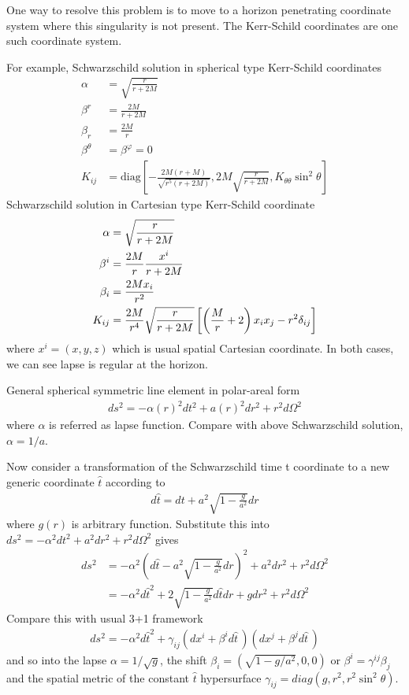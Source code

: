 \documentclass[a4paper,oneside,openany,11pt]{memoir}
\numberwithin{equation}{section} %
\begin{document}
One way to resolve this problem is to move to a horizon penetrating coordinate system where this singularity is not present. The Kerr-Schild coordinates are one such coordinate system. 

For example, Schwarzschild solution in spherical type Kerr-Schild coordinates
\begin{align}
\alpha &= \sqrt{\frac{r}{r+2M}} \\
\beta^r &= \frac{2M}{r+2M} \\
\beta_r &=\frac{2M}{r} \\
\beta^\theta &= \beta^\varphi = 0 \\
K_{ij} &= \textrm{diag} \left[ -\frac{2M(r+M)}{\sqrt{r^5 (r+2M)}} , 2M \sqrt{\frac{r}{r+2M}}, K_{\theta \theta} \sin^2 \theta \right]
\end{align}
Schwarzschild solution in Cartesian type Kerr-Schild coordinate
\begin{align}
\alpha &= \sqrt{\frac{r}{r+2M}} \\
\beta^i &= \frac{2M}{r} \frac{x^i}{r+2M} \\
\beta_i &=\frac{2M x_i}{r^2} \\
K_{ij} &= \-\frac{2M}{r^4} \sqrt{\frac{r}{r+2M}} \left[ \left( \frac{M}{r}+2 \right) x_i x_j - r^2 \delta_{ij} \right]
\end{align}
where $x^i = (x,y,z)$ which is usual spatial Cartesian coordinate. In both cases, we can see lapse is regular at the horizon.

General spherical symmetric line element in polar-areal form
\begin{align}
\label{eqn:ss-met-pa}
ds^2 = - \alpha(r)^2 dt^2 + a(r)^2 dr^2 + r^2 d \Omega^2
\end{align}
where $\alpha$ is referred as lapse function. Compare with above Schwarzschild solution, $\alpha = 1/a$. 

Now consider a transformation of the Schwarzschild time t coordinate to a new generic coordinate $\hat{t}$ according to
\begin{align}
d\hat{t} = dt + a^2 \sqrt{1-\frac{g}{a^2}} dr
\end{align}
where $g(r)$ is arbitrary function. Substitute this into $ds^2 = -\alpha^2 dt^2 + a^2 dr^2 + r^2 d\Omega^2$ gives
\begin{align}
ds^2 &= - \alpha^2 \left (d\hat{t} - a^2 \sqrt{1-\frac{g}{a^2}} dr\right)^2 + a^2 dr^2 + r^2 d\Omega^2 \nonumber \\
&= - \alpha^2 d \hat{t}^2 + 2 \sqrt{1-\frac{g}{a^2}} d\hat{t} dr + g dr^2 + r^2 d \Omega^2
\end{align}
Compare this with usual 3+1 framework
\begin{align}
ds^2 = - \alpha^2 d \hat{t}^2 + \gamma_{ij} (dx^i + \beta^i d\hat{t}\,)(dx^j + \beta^j d\hat{t}\,)
\end{align}
and so into the lapse $\alpha = 1/\sqrt{g}$, the shift $\beta_i = (\sqrt{1-g/a^2},0,0)$ or $\beta^i = \gamma^{ij} \beta_j$ and the spatial metric of the constant $\hat{t}$ hypersurface $\gamma_{ij} = diag(g,r^2,r^2\sin^2 \theta)$. 
\end{document}
